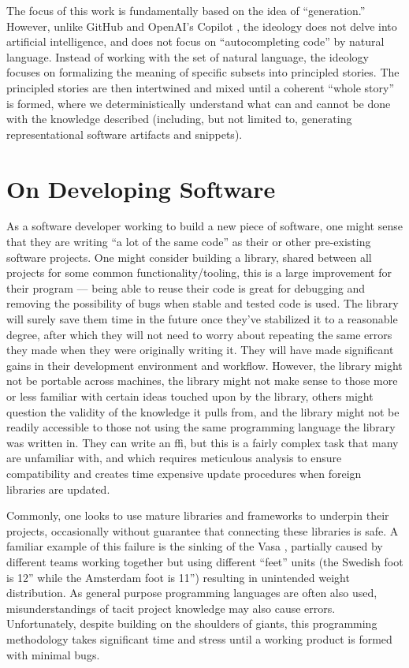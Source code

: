 The focus of this work is fundamentally based on the idea of ``generation.''
However, unlike GitHub and OpenAI's Copilot \cite{Copilot}, the ideology does
not delve into artificial intelligence, and does not focus on ``autocompleting
code'' by natural language. Instead of working with the set of natural language,
the ideology focuses on formalizing the meaning of specific subsets into
principled stories. The principled stories are then intertwined and mixed until
a coherent ``whole story'' is formed, where we deterministically understand what
can and cannot be done with the knowledge described (including, but not limited
to, generating representational software artifacts and snippets).

\section{On Developing Software}
\label{sec:idlgy:on_developing_software}

As a software developer working to build a new piece of software, one might
sense that they are writing ``a lot of the same code'' as their or other
pre-existing software projects. One might consider building a library, shared
between all projects for some common functionality/tooling, this is a large
improvement for their program --- being able to reuse their code is great for
debugging and removing the possibility of bugs when stable and tested code is
used. The library will surely save them time in the future once they've
stabilized it to a reasonable degree, after which they will not need to worry
about repeating the same errors they made when they were originally writing it.
They will have made significant gains in their development environment and
workflow. However, the library might not be portable across machines, the
library might not make sense to those more or less familiar with certain ideas
touched upon by the library, others might question the validity of the knowledge
it pulls from, and the library might not be readily accessible to those not
using the same programming language the library was written in. They can write
an \acs{ffi}, but this is a fairly complex task that many are unfamiliar with,
and which requires meticulous analysis to ensure compatibility and creates time
expensive update procedures when foreign libraries are updated.

Commonly, one looks to use mature libraries and frameworks to underpin their
projects, occasionally without guarantee that connecting these libraries is
safe. A familiar example of this failure is the sinking of the Vasa
\cite{wiki:Vasa_ship}, partially caused by different teams working together but
using different ``feet'' units (the Swedish foot is 12'' while the Amsterdam
foot is 11'') resulting in unintended weight distribution. As general purpose
programming languages are often also used, misunderstandings of tacit project
knowledge may also cause errors. Unfortunately, despite building on the
shoulders of giants, this programming methodology takes significant time and
stress until a working product is formed with minimal bugs.

